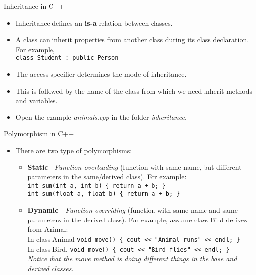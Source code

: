 \documentclass[aspectratio=169]{beamer}
\begin{document}
\begin{frame}[fragile]{Inheritance in C++}
	\begin{itemize}
		\item Inheritance defines an \textbf{is-a} relation between classes.
		\item A class can inherit properties from another class during its class declaration. For example,\\ \verb|class Student : public Person|
		\item The access specifier determines the mode of inheritance.
		\item This is followed by the name of the class from which we need inherit methods and variables.
		\item Open the example \textit{animals.cpp} in the folder \textit{inheritance}.
	\end{itemize}
\end{frame}

\begin{frame}[fragile]{Polymorphism in C++}
	\begin{itemize}
		\item There are two type of polymorphisms: 
		\begin{itemize}
			\item \textbf{Static} - \textit{Function overloading} (function with same name, but different parameters in the same/derived class). For example:\\ \verb|int sum(int a, int b) { return a + b; }| \\ \verb|int sum(float a, float b) { return a + b; }|
			\item \textbf{Dynamic} - \textit{Function overriding} (function with same name and same parameters in the derived class). For example, assume class Bird derives from Animal: \\ In class Animal \verb|void move() { cout << "Animal runs" << endl; }| \\ In class Bird, \verb|void move() { cout << "Bird flies" << endl; }| \\ \textit{Notice that the move method is doing different things in the base and derived classes}.
		\end{itemize}
	\end{itemize}
\end{frame}
\end{document}
